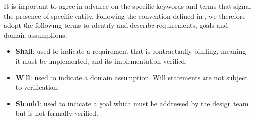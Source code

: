 It is important to agree in advance on the specific keywords and terms that signal the presence of specific entity. Following the convention defined in \cite{iso_ieee_standard}, we therefore adopt the following terms to identify and describe requirements, goals and domain assumptions.

\begin{itemize}
    \item \textbf{Shall}: used to indicate a requirement that is contractually binding, meaning it must be implemented, and its implementation verified;
    \item \textbf{Will}: used to indicate a domain assumption.  Will statements are not subject to verification;
    \item \textbf{Should}: used to indicate a goal which must be addressed by the design team but is not formally verified.
\end{itemize}

